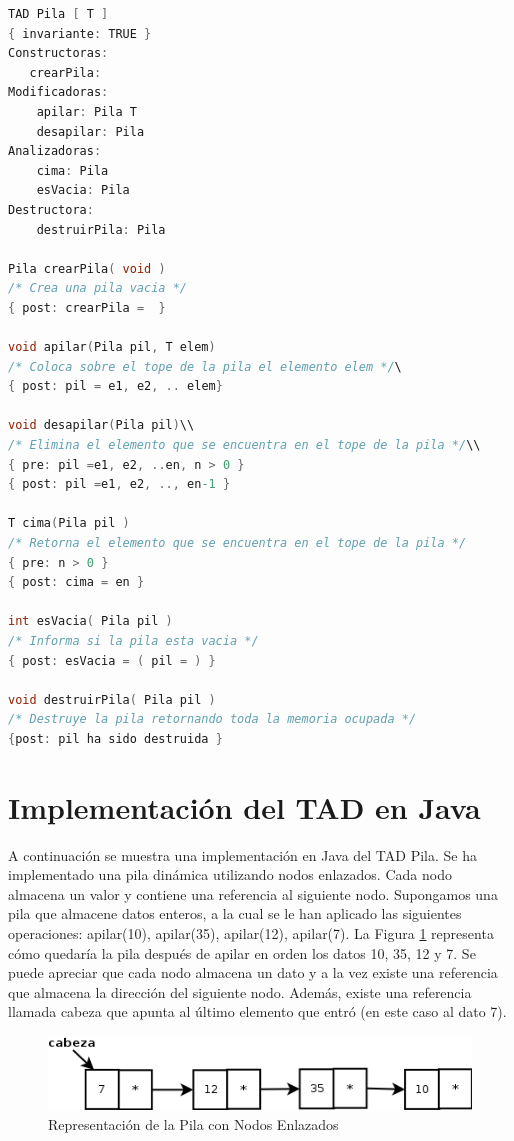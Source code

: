 \begin{lstlisting}[numbers=none, language=C]
TAD Pila [ T ]
{ invariante: TRUE }
Constructoras:
   crearPila: 
Modificadoras:
	apilar: Pila T 
	desapilar: Pila
Analizadoras:
	cima: Pila 
	esVacia: Pila
Destructora:
	destruirPila: Pila

Pila crearPila( void )
/* Crea una pila vacia */
{ post: crearPila =  }

void apilar(Pila pil, T elem)
/* Coloca sobre el tope de la pila el elemento elem */\
{ post: pil = e1, e2, .. elem}

void desapilar(Pila pil)\\
/* Elimina el elemento que se encuentra en el tope de la pila */\\
{ pre: pil =e1, e2, ..en, n > 0 }
{ post: pil =e1, e2, .., en-1 }

T cima(Pila pil )
/* Retorna el elemento que se encuentra en el tope de la pila */
{ pre: n > 0 }
{ post: cima = en }

int esVacia( Pila pil )
/* Informa si la pila esta vacia */
{ post: esVacia = ( pil = ) }

void destruirPila( Pila pil )
/* Destruye la pila retornando toda la memoria ocupada */
{post: pil ha sido destruida }
\end{lstlisting}

\section{Implementación del TAD en Java}
A continuación se muestra una implementación en Java del TAD Pila. Se ha implementado una pila dinámica utilizando nodos enlazados.  Cada nodo almacena un valor y contiene una referencia al siguiente nodo. Supongamos una pila que almacene datos enteros, a la cual se le han aplicado las siguientes operaciones: apilar(10), apilar(35), apilar(12), apilar(7). La Figura \ref{fig:pila-nodos-enlazados} representa cómo quedaría la pila después de apilar en orden los datos 10, 35, 12 y 7. Se puede apreciar que cada nodo almacena un dato y a la vez existe una referencia que almacena la dirección del siguiente nodo. Además, existe una referencia llamada cabeza que apunta al último elemento que entró (en este caso al dato 7).

\begin{figure}
	\centering
	\includegraphics[scale=0.7]{Diagramas/RepresentacionPilaNodosEnlazados}
	\caption{Representación de la Pila con Nodos Enlazados}	
	\label{fig:pila-nodos-enlazados}
\end{figure}

